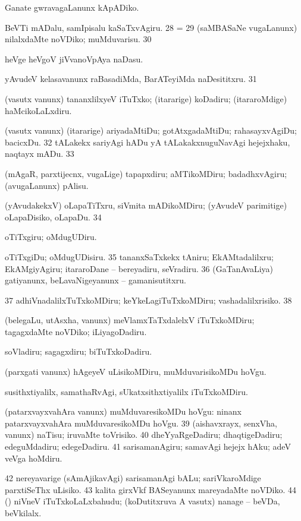 { Ganate gwravagaLanunx kApADiko. 

 BeVTi mADalu, samIpisalu kaSaTxvAgiru. 
\num{28}  = \hyperlink{keepnuga24}{\nuga {}} 
\num{29}  (saMBASaNe \mo vugaLanunx) nilalxdaMte noVDiko; muMduvarisu.
\num{30}  

 heVge heVgoV jiVvanoVpAya naDasu.

 yAvudeV kelasavanunx raBasadiMda, BarATeyiMda naDesititxru. 
\num{31}  

 (vasutx \mo vanunx) tananxlilxyeV iTuTxko; (itararige) koDadiru; (itararoMdige) haMcikoLaLxdiru. 

 (vasutx \mo vanunx) (itararige) ariyadaMtiDu; gotAtxgadaMtiDu; rahasayxvAgiDu; bacicxDu. 
\num{32}  tALakekx sariyAgi hADu yA tALakakxnuguNavAgi hejejxhaku, naqtayx mADu.
\num{33}  

 (mAgaR, parxtijecnx, \mo vugaLige) tapapxdiru; aMTikoMDiru; badadhxvAgiru; (avugaLanunx) pAlisu. 

 (yAvudakekxV) oLapaTiTxru, siVmita mADikoMDiru; (yAvudeV parimitige) oLapaDisiko, oLapaDu. 
\num{34}  

 oTiTxgiru; oMdugUDiru. 

 oTiTxgiDu; oMdugUDisiru. 
\num{35}  tananxSaTxkekx tAniru; EkAMtadalilxru; EkAMgiyAgiru; itararoDane -- bereyadiru, seVradiru. 
\num{36}  (GaTanAvaLiya) gatiyanunx, beLavaNigeyanunx --  gamanisutitxru. 
\num{37}  adhiVnadalilxTuTxkoMDiru; keYkeLagiTuTxkoMDiru;
vashadalilxrisiko. 
\num{38}  

 (belegaLu, utAsxha, \mo vanunx) meVlamxTaTxdalelxV iTuTxkoMDiru; tagagxdaMte noVDiko; iLiyagoDadiru.

 soVladiru; sagagxdiru; biTuTxkoDadiru. 

 (parxgati \mo vanunx) hAgeyeV uLisikoMDiru, muMduvarisikoMDu hoVgu. 

 susithxtiyalilx, samathaRvAgi, sUkatxsithxtiyalilx iTuTxkoMDiru. 

 (patarxvayxvahAra \mo vanunx) muMduvaresikoMDu hoVgu:  ninanx patarxvayxvahAra muMduvaresikoMDu hoVgu. 
\num{39}  (aishavxrayx, senxVha, \mo vanunx) naTisu; iruvaMte toVrisiko.
\num{40}  dheYyaRgeDadiru; dhaqtigeDadiru; edeguMdadiru; edegeDadiru. 
\num{41}  sarisamanAgiru; samavAgi hejejx hAku; adeV veVga hoMdiru. 
\num{42} 
nereyavarige (sAmAjikavAgi) sarisamanAgi bALu; sariVkaroMdige parxtiSeThx uLisiko. 
\num{43}  kalita girxVkf BASeyanunx mareyadaMte noVDiko. 
\num{44}  (\AmA) niVneV iTuTxkoLaLxbahudu; (koDutitxruva A vasutx) nanage -- beVDa, beVkilalx.}
\eentry

